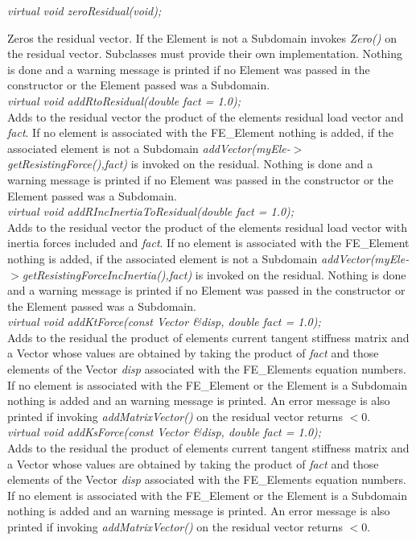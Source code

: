 {\em virtual void zeroResidual(void);} 

Zeros the residual vector. If the Element is not a Subdomain invokes
{\em Zero()} on the residual vector. Subclasses must provide their own
implementation. Nothing is done and a warning message is printed if no
Element was passed in the constructor or the Element passed was a
Subdomain.\\ 


{\em virtual void addRtoResidual(double fact = 1.0); }\\
Adds to the residual vector the product of the elements residual load
vector and {\em fact}. If no element is associated with the
FE\_Element nothing is added, if the associated element is not a
Subdomain {\em addVector(myEle-$>$getResistingForce(),fact)} is
invoked on the residual. Nothing is done and a warning message is
printed if no Element was passed in the constructor or the Element
passed was a Subdomain. \\   

{\em virtual void addRIncInertiaToResidual(double fact = 1.0); }\\
Adds to the residual vector the product of the elements residual load
vector with inertia forces included and {\em fact}. If no element is
associated with the FE\_Element nothing is added, if the associated
element is not a Subdomain {\em
addVector(myEle-$>$getResistingForceIncInertia(),fact)} is 
invoked on the residual. Nothing is done and a warning message is
printed if no Element was passed in the constructor or the Element
passed was a Subdomain. \\   

{\em virtual void addKtForce(const Vector \&disp, double fact = 1.0);    }\\
Adds to the residual the product of elements current tangent stiffness matrix
and a Vector whose values are obtained by taking the product of {\em
fact} and those elements of the Vector {\em disp} associated with 
the FE\_Elements equation numbers. If no element is associated with the
FE\_Element or the Element is a Subdomain nothing is added and an
warning message is printed. An error message is also printed if invoking
{\em addMatrixVector()} on the residual vector returns $< 0$.\\

{\em virtual void addKsForce(const Vector \&disp, double fact = 1.0);    }\\
Adds to the residual the product of elements current tangent stiffness matrix
and a Vector whose values are obtained by taking the product of {\em
fact} and those elements of the Vector {\em disp} associated with 
the FE\_Elements equation numbers. If no element is associated with the
FE\_Element or the Element is a Subdomain nothing is added and an
warning message is printed. An error message is also printed if invoking
{\em addMatrixVector()} on the residual vector returns $< 0$.\\


